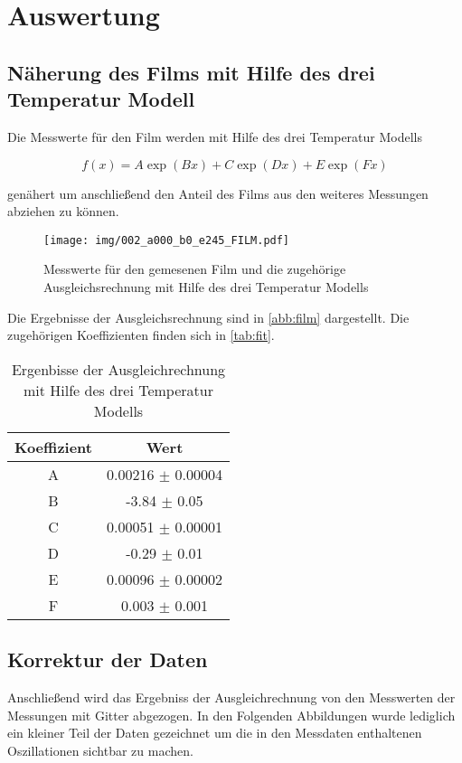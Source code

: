 \section{Auswertung}

\subsection{Näherung des Films mit Hilfe des drei Temperatur Modell}
Die Messwerte für den Film werden mit Hilfe des drei Temperatur Modells

\begin{equation}
f(x) = A\exp{(Bx)} + C\exp{(Dx)} + E\exp{(Fx)}
\end{equation}

\noindent genähert um anschließend den Anteil des Films aus den weiteres Messungen abziehen zu können.

\begin{figure}[!htbp]
 	\centering
 	\texttt{[image: img/002\_a000\_b0\_e245\_FILM.pdf]}
 	\caption{Messwerte für den gemesenen Film und die zugehörige Ausgleichsrechnung mit Hilfe des drei Temperatur Modells}
 	\label{abb:film}
\end{figure}

Die Ergebnisse der Ausgleichsrechnung sind in \autoref{abb:film} dargestellt. Die zugehörigen Koeffizienten finden sich in \autoref{tab:fit}.

\begin{table}[!htbp]
 \centering
\begin{tabular}{cc}
    Koeffizient & Wert \\
	\midrule
 	A & 0.00216 $\pm$ 0.00004 \\
 	B & -3.84 $\pm$ 0.05 \\
 	C & 0.00051 $\pm$ 0.00001 \\
 	D & -0.29 $\pm$ 0.01 \\
 	E & 0.00096 $\pm$ 0.00002 \\
 	F & 0.003 $\pm$ 0.001 \\
\end{tabular}
\caption{Ergenbisse der Ausgleichrechnung mit Hilfe des drei Temperatur Modells}
\label{tab:fit}
\end{table}

\newpage

\subsection{Korrektur der Daten}
Anschließend wird das Ergebniss der Ausgleichrechnung von den Messwerten der Messungen mit Gitter abgezogen.
In den Folgenden Abbildungen wurde lediglich ein kleiner Teil der Daten gezeichnet um die in den Messdaten enthaltenen 
Oszillationen sichtbar zu machen.

